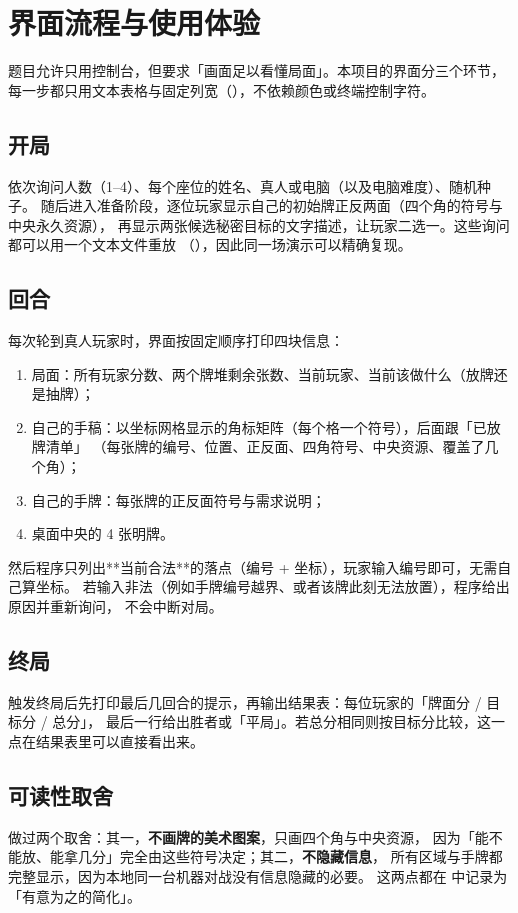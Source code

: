 \section{界面流程与使用体验}
题目允许只用控制台，但要求「画面足以看懂局面」。本项目的界面分三个环节，
每一步都只用文本表格与固定列宽（），不依赖颜色或终端控制字符。

\subsection{开局}
 依次询问人数（1--4）、每个座位的姓名、真人或电脑（以及电脑难度）、随机种子。
随后进入准备阶段，逐位玩家显示自己的初始牌正反两面（四个角的符号与中央永久资源），
再显示两张候选秘密目标的文字描述，让玩家二选一。这些询问都可以用一个文本文件重放
（），因此同一场演示可以精确复现。

\subsection{回合}
每次轮到真人玩家时，界面按固定顺序打印四块信息：
\begin{enumerate}
\item 局面：所有玩家分数、两个牌堆剩余张数、当前玩家、当前该做什么（放牌还是抽牌）；
\item 自己的手稿：以坐标网格显示的角标矩阵（每个格一个符号），后面跟「已放牌清单」
      （每张牌的编号、位置、正反面、四角符号、中央资源、覆盖了几个角）；
\item 自己的手牌：每张牌的正反面符号与需求说明；
\item 桌面中央的 4 张明牌。
\end{enumerate}
然后程序只列出**当前合法**的落点（编号 + 坐标），玩家输入编号即可，无需自己算坐标。
若输入非法（例如手牌编号越界、或者该牌此刻无法放置），程序给出原因并重新询问，
不会中断对局。

\subsection{终局}
触发终局后先打印最后几回合的提示，再输出结果表：每位玩家的「牌面分 / 目标分 / 总分」，
最后一行给出胜者或「平局」。若总分相同则按目标分比较，这一点在结果表里可以直接看出来。

\subsection{可读性取舍}
做过两个取舍：其一，\textbf{不画牌的美术图案}，只画四个角与中央资源，
因为「能不能放、能拿几分」完全由这些符号决定；其二，\textbf{不隐藏信息}，
所有区域与手牌都完整显示，因为本地同一台机器对战没有信息隐藏的必要。
这两点都在  中记录为「有意为之的简化」。

